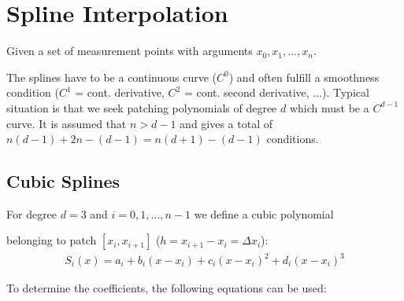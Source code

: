 \section{Spline Interpolation}

Given a set of measurement points with arguments $x_0,x_1,\ldots,x_n$.


The splines have to be a continuous curve ($C^0$) and often fulfill a smoothness condition
($C^1$ = cont. derivative, $C^2$ = cont. second derivative, ...).
Typical situation is that we seek patching polynomials of degree $d$ which must be a $C^{d-1}$ curve.
It is assumed that $n > d-1$ and gives a total of $n(d-1) + 2n - (d-1) = n(d+1) - (d-1)$ conditions.

\subsection{Cubic Splines}

For degree $d = 3$ and $i=0,1,\ldots,n-1$ we define a cubic polynomial
\begin{snugshade*}
    belonging to patch $[x_i,x_{i+1}]$ ($h=x_{i+1}-x_i = \Delta x_i$):
    \begin{align*}
        S_i(x) = a_i + b_i(x-x_i) + c_i(x-x_i)^2 + d_i(x-x_i)^3
    \end{align*}
\end{snugshade*}

To determine the coefficients, the following equations can be used:

